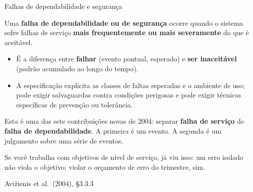 \documentclass{beamer}
\newcommand{\sect}[1]{\par\smallskip\hfill{\tiny\color{black!55}Avi\v{z}ienis et al.\ (2004), #1}}
\begin{document}
\begin{frame}{Falhas de dependabilidade e seguran\c{c}a}
    \footnotesize
    \begin{defi}
        \scriptsize
        Uma \textbf{falha de dependabilidade ou de seguran\c{c}a} ocorre quando o sistema sofre falhas de servi\c{c}o \textbf{mais frequentemente ou mais severamente} do que \'e aceit\'avel.
    \end{defi}
    \medskip
    \begin{itemize}
        \item \'E a diferen\c{c}a entre \textbf{falhar} (evento pontual, esperado) e \textbf{ser inaceit\'avel} (padr\~ao acumulado ao longo do tempo).
        \item A especifica\c{c}\~ao explicita as classes de faltas esperadas e o ambiente de uso; pode exigir salvaguardas contra condi\c{c}\~oes perigosas e pode exigir t\'ecnicas espec\'ificas de preven\c{c}\~ao ou toler\^ancia.
    \end{itemize}
    \medskip
    \begin{ancora}
        \footnotesize
        Esta \'e uma das sete contribui\c{c}\~oes novas de 2004: separar \textbf{falha de servi\c{c}o} de \textbf{falha de dependabilidade}. A primeira \'e um evento. A segunda \'e um julgamento sobre uma s\'erie de eventos.
    \end{ancora}
    \medskip
    \begin{pratica}
        \scriptsize
        Se voc\^e trabalha com objetivos de n\'ivel de servi\c{c}o, j\'a viu isso: um erro isolado n\~ao viola o objetivo; violar o or\c{c}amento de erro do trimestre, sim.
    \end{pratica}
    \sect{\S3.3.3}
\end{frame}
\end{document}
